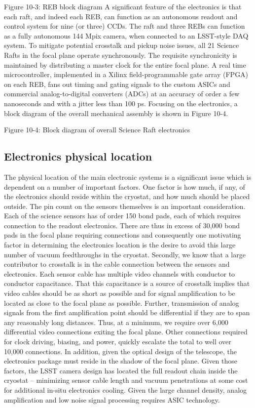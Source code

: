 Figure 10-3: REB block diagram
A significant feature of the electronics is that each raft, and indeed each REB, can function as an autonomous readout and control system for nine (or three) CCDs. The raft and three REBs can function as a fully autonomous 144 Mpix camera, when connected to an LSST-style DAQ system.
To mitigate potential crosstalk and pickup noise issues, all 21 Science Rafts in the focal plane operate synchronously. The requisite synchronicity is maintained by distributing a master clock for the entire focal plane. A real time microcontroller, implemented in a Xilinx field-programmable gate array (FPGA) on each REB, fans out timing and gating signals to the custom ASICs and commercial analog-to-digital converters (ADCs) at an accuracy of order a few nanoseconds and with a jitter less than 100 ps. 
Focusing on the electronics, a block diagram of the overall mechanical assembly is shown in Figure 10-4.
  
Figure 10-4: Block diagram of overall Science Raft electronics 

\subsection{Electronics physical location}

The physical location of the main electronic systems is a significant issue which is dependent on a number of important factors. One factor is how much, if any, of the electronics should reside within the cryostat, and how much should be placed outside. 
The pin count on the sensors themselves is an important consideration. Each of the science sensors has of order 150 bond pads, each of which requires connection to the readout electronics. There are thus in excess of 30,000 bond pads in the focal plane requiring connections and consequently one motivating factor in determining the electronics location is the desire to avoid this large number of vacuum feedthroughs in the cryostat. Secondly, we know that a large contributor to crosstalk is in the cable connection between the sensors and electronics. Each sensor cable has multiple video channels with conductor to conductor capacitance. That this capacitance is a source of crosstalk implies that video cables should be as short as possible and for signal amplification to be located as close to the focal plane as possible. Further, transmission of analog signals from the first amplification point should be differential if they are to span any reasonably long distances. Thus, at a minimum, we require over 6,000 differential video connections exiting the focal plane. 
Other connections required for clock driving, biasing, and power, quickly escalate the total to well over 10,000 connections. In addition, given the optical design of the telescope, the electronics package must reside in the shadow of the focal plane. Given those factors, the LSST camera design has located the full readout chain inside the cryostat – minimizing sensor cable length and vacuum penetrations at some cost for additional in-situ electronics cooling. Given the large channel density, analog amplification and low noise signal processing requires ASIC technology. 

